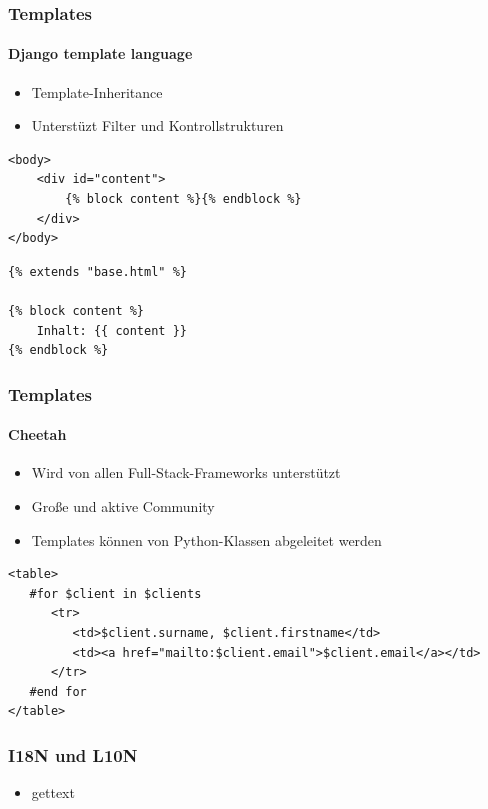 \documentclass[
    t,
    smaller,
    compress,
]{beamer}
\begin{document}
\begin{frame}[fragile]
	\frametitle{Templates}
	\framesubtitle{Django template language}
	 \begin{itemize}[<1->]
	 	\item Template-Inheritance
	 	\item Unterstüzt Filter und Kontrollstrukturen
	 \end{itemize}
\begin{lstlisting}
<body>
    <div id="content">
        {% block content %}{% endblock %}
    </div>
</body>
\end{lstlisting}
\begin{lstlisting}
{% extends "base.html" %}

{% block content %}
    Inhalt: {{ content }} 
{% endblock %}
\end{lstlisting}
\end{frame}

\begin{frame}[fragile]
	\frametitle{Templates}
	\framesubtitle{Cheetah}
	 \begin{itemize}[<1->]
	 	\item Wird von allen Full-Stack-Frameworks unterstützt
	 	\item Große und aktive Community
	 	\item Templates können von Python-Klassen abgeleitet werden
	 \end{itemize}
\begin{lstlisting}
<table>
   #for $client in $clients
      <tr>
         <td>$client.surname, $client.firstname</td>
         <td><a href="mailto:$client.email">$client.email</a></td>
      </tr>
   #end for
</table>
\end{lstlisting}
\end{frame}

\begin{frame}
  \frametitle{I18N und L10N}
  \begin{itemize}[<1->]
    \item gettext
  \end{itemize}
\end{frame}
\end{document}
